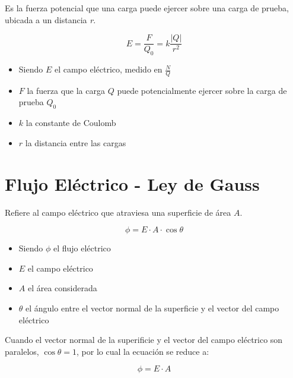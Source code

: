 Es la fuerza potencial que una carga puede ejercer sobre una carga de prueba,
ubicada a un distancia \textit{r}.

\vspace{1cm}
\begin{equation}
    E = \frac{F}{Q_0} = k \frac{|Q|}{r^{2}}
\end{equation}
\vspace{1cm}

\begin{itemize}
    \item Siendo \(E\) el campo eléctrico, medido en \(\frac{N}{Q}\)
    \item \(F\) la fuerza que la carga \(Q\) puede potencialmente ejercer sobre la carga de prueba \(Q_0\)
    \item \(k\) la constante de Coulomb 
    \item \(r\) la distancia entre las cargas
\end{itemize}

\section{Flujo Eléctrico - Ley de Gauss}

Refiere al campo eléctrico que atraviesa una superficie de área \(A\).

\vspace{1cm}
\begin{equation*}
    \phi = E \cdot A \cdot \cos \theta
\end{equation*}
\vspace{1cm}

\begin{itemize}
    \item Siendo \(\phi\) el flujo eléctrico 
    \item \(E\) el campo eléctrico 
    \item \(A\) el área considerada
    \item \(\theta\) el ángulo entre el vector normal de la superficie y el vector del campo eléctrico
\end{itemize}

Cuando el vector normal de la superificie y el vector del campo eléctrico son paralelos,
\(\cos\theta = 1\), por lo cual la ecuación se reduce a:

\vspace{1cm}
\begin{equation}
    \phi = E\cdot A
\end{equation}
\vspace{1cm}

